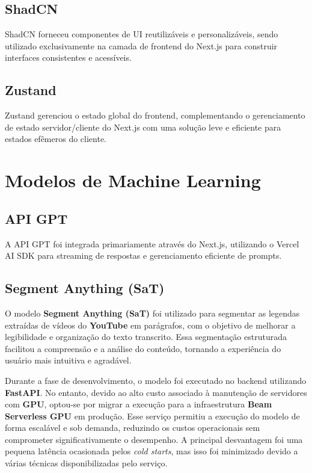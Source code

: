 \documentclass[tcc,capa]{texufpel}
\begin{document}
\subsection{ShadCN}
ShadCN forneceu componentes de UI reutilizáveis e personalizáveis, sendo utilizado exclusivamente na camada de frontend do Next.js para construir interfaces consistentes e acessíveis.

\subsection{Zustand}
Zustand gerenciou o estado global do frontend, complementando o gerenciamento de estado servidor/cliente do Next.js com uma solução leve e eficiente para estados efêmeros do cliente.

\section{Modelos de Machine Learning}

\subsection{API GPT}
A API GPT foi integrada primariamente através do Next.js, utilizando o Vercel AI SDK para streaming de respostas e gerenciamento eficiente de prompts.

\subsection{Segment Anything (SaT)}

O modelo \textbf{Segment Anything (SaT)} foi utilizado para segmentar as legendas extraídas de vídeos do \textbf{YouTube} em parágrafos, com o objetivo de melhorar a legibilidade e organização do texto transcrito. Essa segmentação estruturada facilitou a compreensão e a análise do conteúdo, tornando a experiência do usuário mais intuitiva e agradável.

Durante a fase de desenvolvimento, o modelo foi executado no backend utilizando \textbf{FastAPI}. No entanto, devido ao alto custo associado à manutenção de servidores com \textbf{GPU}, optou-se por migrar a execução para a infraestrutura \textbf{Beam Serverless GPU} em produção. Esse serviço permitiu a execução do modelo de forma escalável e sob demanda, reduzindo os custos operacionais sem comprometer significativamente o desempenho. A principal desvantagem foi uma pequena latência ocasionada pelos \textit{cold starts}, mas isso foi minimizado devido a várias técnicas disponibilizadas pelo serviço.
\end{document}
